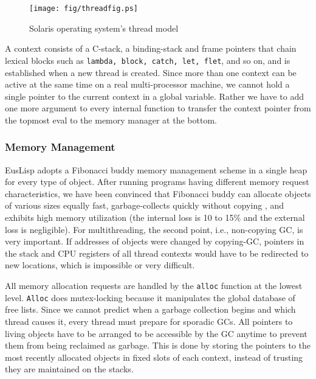 \begin{figure}[b]
\begin{center}
\texttt{[image: fig/threadfig.ps]}

\caption{Solaris operating system's thread model}\label{threadmodel}
\end{center}
\end{figure}

A context consists of a C-stack, a binding-stack and frame 
pointers that chain lexical blocks such as {\tt lambda, block, catch,
let, flet}, and so on,  and is established when a new thread
is created. Since more than one context can be active at
the same time on a real multi-processor machine, we cannot
hold a single pointer to the current context in a global variable.
Rather we have to add one more argument to every internal
function to transfer the context pointer  from the topmost eval
to the memory manager at the bottom.

\subsubsection{Memory Management}
EusLisp adopts a Fibonacci buddy memory management scheme in a
single heap for every type of object. 
After running programs having
different memory request characteristics, we have been convinced that
Fibonacci buddy can allocate objects of various sizes equally fast,
garbage-collects quickly without copying , and exhibits high memory
utilization (the internal loss is 10 to 15\% and the
external loss is negligible).
For multithreading, the second point, i.e., non-copying GC, is very
important.
If addresses of objects were changed by copying-GC, pointers in the
stack and CPU registers of all thread contexts would have to be
redirected to new locations, which is impossible or very difficult. 

All memory allocation requests are handled by the {\tt alloc} function at the
lowest level.
{\tt Alloc} does mutex-locking because it manipulates the global
database of free lists.
Since we cannot predict when a garbage
collection begins and which thread causes it, every thread must prepare
for sporadic GCs.  All pointers to living objects have to be arranged
to be accessible by the GC anytime to prevent them from being reclaimed
as garbage.  This is done by storing the pointers to the most recently
allocated objects in fixed slots of each context, instead of trusting
they are maintained on the stacks.


